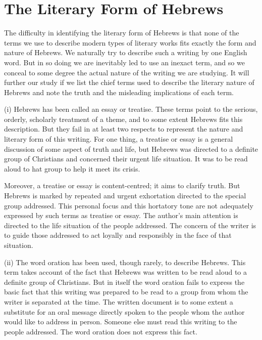 \newpage
\section{The Literary Form of Hebrews}
The difficulty in identifying the literary form of Hebrews is that none of the
terms we use to describe modern types of literary works fits exactly the form
and nature of Hebrews.
We naturally try to describe such a writing by one English word.
But in so doing we are inevitably led to use an inexact term, and so we conceal
to some degree the actual nature of the writing we are studying.
It will further our study if we list the chief terms used to describe the
literary nature of Hebrews and note the truth and the misleading implications of
each term.
\newline

(i) Hebrews has been called an essay or treatise.
These terms point to the serious, orderly, scholarly treatment of a theme, and
to some extent Hebrews fits this description.
But they fail in at least two respects to represent the nature and literary form
of this writing.
For one thing, a treatise or essay is a general discussion of some aspect of
truth and life, but  Hebrews was directed to a definite group of Christians and
concerned their urgent life situation.
It was to be read aloud to hat group to help it meet its crisis.
\newline

Moreover, a treatise or essay is content-centred; it aims to clarify truth.
But Hebrews is marked by repeated and urgent exhortation directed to the special
group addressed.
This personal focus and this hortatory tone are not adequately expressed by such
terms as treatise or essay.
The author's main attention is directed to the life situation of the people
addressed.
The concern of the writer is to guide those addressed to act loyally and
responsibly in the face of that situation.
\newline

(ii) The word oration has been used, though rarely, to describe Hebrews.
This term takes account of the fact that Hebrews was written to be read aloud to
a definite group of Christians.
But in itself the word oration fails to express the basic fact that this writing
was prepared to be read to a group from whom the writer is separated at the
time.
The written document is to some extent a substitute for an oral message directly
spoken to the people whom the author would like to address in person.
Someone else must read this writing to the people addressed.
The word oration does not express this fact.
\newline

